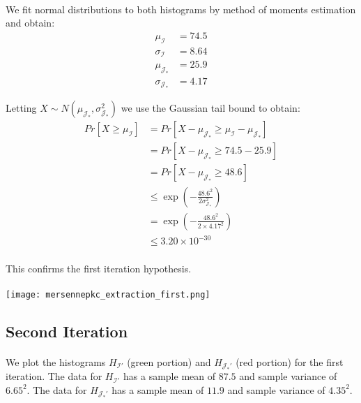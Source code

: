 \paragraph{}
We fit normal distributions to both histograms by method of moments estimation and obtain:
\begin{align*}
    \mu_\mathcal{I} &= 74.5\\
    \sigma_\mathcal{I} &= 8.64\\
    \mu_{\mathcal{J}_*} &= 25.9\\
    \sigma_{\mathcal{J}_*} &= 4.17
\end{align*}

Letting $X \sim N(\mu_{\mathcal{J}_*}, \sigma_{\mathcal{J}_*}^2)$ we use the Gaussian tail bound to obtain:
\begin{align*}
    Pr[X \geq \mu_\mathcal{I}] &= Pr[X - \mu_{\mathcal{J}_*} \geq \mu_\mathcal{I} - \mu_{\mathcal{J}_*}]\\
    &= Pr[X - \mu_{\mathcal{J}_*} \geq 74.5 - 25.9]\\
    &= Pr[X - \mu_{\mathcal{J}_*} \geq 48.6]\\
    &\leq \exp{(-\frac{48.6^2}{2 \sigma_{\mathcal{J}_*}^2})}\\
    &= \exp{(-\frac{48.6^2}{2 \times 4.17^2})}\\
    &\leq 3.20 \times 10^{-30}
\end{align*}

\paragraph{}
This confirms the first iteration hypothesis.

\paragraph{}
\texttt{[image: mersennepkc\_extraction\_first.png]}\newline

\subsection{Second Iteration}
\paragraph{}
We plot the histograms $H_{\mathcal{I}'}$ (green portion) and $H_{\mathcal{J}_*'}$ (red portion) for the first iteration. The data for $H_{\mathcal{I}'}$ has a sample mean of $87.5$ and sample variance of $6.65^2$. The data for $H_{\mathcal{J}_*'}$ has a sample mean of $11.9$ and sample variance of $4.35^2$.
